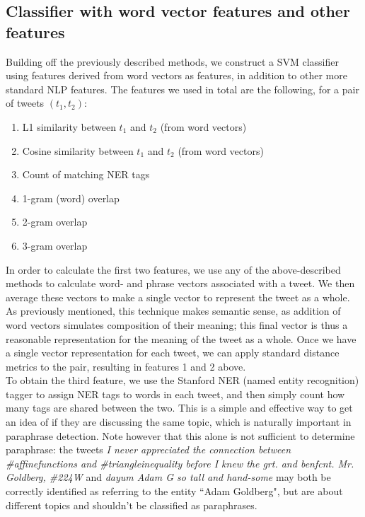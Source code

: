 \documentclass[conference]{IEEEtran}
\begin{document}
\subsection{Classifier with word vector features and other features}
Building off the previously described methods, we construct a SVM classifier using features derived from word vectors as features, in addition to other more standard NLP features.  The features we used in total are the following, for a pair of tweets $(t_1, t_2)$:

\begin{enumerate}
\item L1 similarity between $t_1$ and $t_2$ (from word vectors)
\item Cosine similarity between $t_1$ and $t_2$ (from word vectors)
\item Count of matching NER tags
\item 1-gram (word) overlap
\item 2-gram overlap
\item 3-gram overlap
\end{enumerate}

In order to calculate the first two features, we use any of the above-described methods to calculate word- and phrase vectors associated with a tweet. We then average these vectors to make a single vector to represent the tweet as a whole.  As previously mentioned, this technique makes semantic sense, as addition of word vectors simulates composition of their meaning; this final vector is thus a reasonable representation for the meaning of the tweet as a whole.  Once we have a single vector representation for each tweet, we can apply standard distance metrics to the pair, resulting in features 1 and 2 above.\\

\indent To obtain the third feature, we use the Stanford NER (named entity recognition) tagger to assign NER tags to words in each tweet, and then simply count how many tags are shared between the two.  This is a simple and effective way to get an idea of if they are discussing the same topic, which is naturally important in paraphrase detection.  Note however that this alone is not sufficient to determine paraphrase: the tweets \emph{I never appreciated the connection between \#affinefunctions and \#triangleinequality before I knew the grt. and benfcnt. Mr. Goldberg, \#224W} and \emph{dayum Adam G so tall and hand-some} may both be correctly identified as referring to the entity ``Adam Goldberg", but are about different topics and shouldn't be classified as paraphrases.\\
\end{document}
